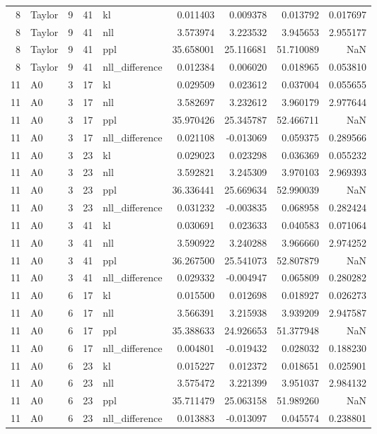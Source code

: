 \begin{tabular}{rlrrlrrrr}
8 & Taylor & 9 & 41 & kl & 0.011403 & 0.009378 & 0.013792 & 0.017697 \\
8 & Taylor & 9 & 41 & nll & 3.573974 & 3.223532 & 3.945653 & 2.955177 \\
8 & Taylor & 9 & 41 & ppl & 35.658001 & 25.116681 & 51.710089 & NaN \\
8 & Taylor & 9 & 41 & nll_difference & 0.012384 & 0.006020 & 0.018965 & 0.053810 \\
11 & A0 & 3 & 17 & kl & 0.029509 & 0.023612 & 0.037004 & 0.055655 \\
11 & A0 & 3 & 17 & nll & 3.582697 & 3.232612 & 3.960179 & 2.977644 \\
11 & A0 & 3 & 17 & ppl & 35.970426 & 25.345787 & 52.466711 & NaN \\
11 & A0 & 3 & 17 & nll_difference & 0.021108 & -0.013069 & 0.059375 & 0.289566 \\
11 & A0 & 3 & 23 & kl & 0.029023 & 0.023298 & 0.036369 & 0.055232 \\
11 & A0 & 3 & 23 & nll & 3.592821 & 3.245309 & 3.970103 & 2.969393 \\
11 & A0 & 3 & 23 & ppl & 36.336441 & 25.669634 & 52.990039 & NaN \\
11 & A0 & 3 & 23 & nll_difference & 0.031232 & -0.003835 & 0.068958 & 0.282424 \\
11 & A0 & 3 & 41 & kl & 0.030691 & 0.023633 & 0.040583 & 0.071064 \\
11 & A0 & 3 & 41 & nll & 3.590922 & 3.240288 & 3.966660 & 2.974252 \\
11 & A0 & 3 & 41 & ppl & 36.267500 & 25.541073 & 52.807879 & NaN \\
11 & A0 & 3 & 41 & nll_difference & 0.029332 & -0.004947 & 0.065809 & 0.280282 \\
11 & A0 & 6 & 17 & kl & 0.015500 & 0.012698 & 0.018927 & 0.026273 \\
11 & A0 & 6 & 17 & nll & 3.566391 & 3.215938 & 3.939209 & 2.947587 \\
11 & A0 & 6 & 17 & ppl & 35.388633 & 24.926653 & 51.377948 & NaN \\
11 & A0 & 6 & 17 & nll_difference & 0.004801 & -0.019432 & 0.028032 & 0.188230 \\
11 & A0 & 6 & 23 & kl & 0.015227 & 0.012372 & 0.018651 & 0.025901 \\
11 & A0 & 6 & 23 & nll & 3.575472 & 3.221399 & 3.951037 & 2.984132 \\
11 & A0 & 6 & 23 & ppl & 35.711479 & 25.063158 & 51.989260 & NaN \\
11 & A0 & 6 & 23 & nll_difference & 0.013883 & -0.013097 & 0.045574 & 0.238801 \\

\end{tabular}
